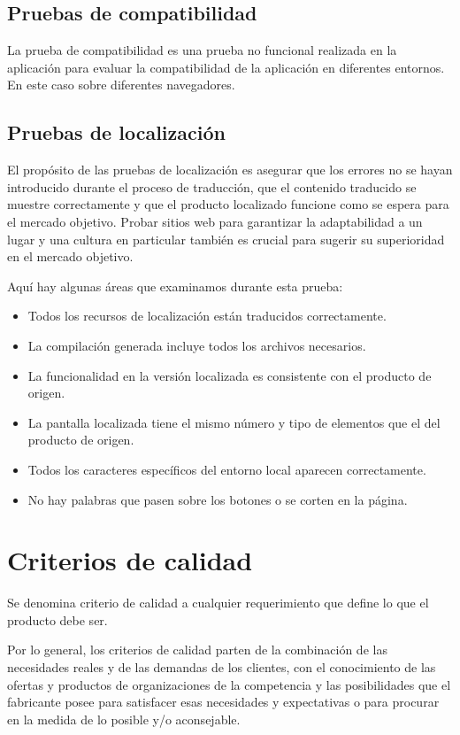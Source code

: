 \subsection{Pruebas de compatibilidad}
La prueba de compatibilidad es una prueba no funcional realizada en la
aplicación para evaluar la compatibilidad de la aplicación en diferentes
entornos. En este caso sobre diferentes navegadores.

\subsection{Pruebas de localización}
El propósito de las pruebas de localización es asegurar que los errores no se
hayan introducido durante el proceso de traducción, que el contenido traducido
se muestre correctamente y que el producto localizado funcione como se espera
para el mercado objetivo. Probar sitios web para garantizar la adaptabilidad a
un lugar y una cultura en particular también es crucial para sugerir su
superioridad en el mercado objetivo\cite{Sampair}.

Aquí hay algunas áreas que examinamos durante esta prueba:

\begin{itemize}
\item Todos los recursos de localización están traducidos correctamente.
\item La compilación generada incluye todos los archivos necesarios.
\item La funcionalidad en la versión localizada es consistente con el producto de origen.
\item La pantalla localizada tiene el mismo número y tipo de elementos que el del producto de origen.
\item Todos los caracteres específicos del entorno local aparecen correctamente.
\item No hay palabras que pasen sobre los botones o se corten en la página.
\end{itemize}

\section{Criterios de calidad}
Se denomina criterio de calidad a cualquier requerimiento que define lo que el
producto debe ser.

Por lo general, los criterios de calidad parten de la combinación de las
necesidades reales y de las demandas de los clientes, con el conocimiento de las
ofertas y productos de organizaciones de la competencia y las posibilidades que
el fabricante posee para satisfacer esas necesidades y expectativas o para
procurar en la medida de lo posible y/o aconsejable\cite{Haaz}.

